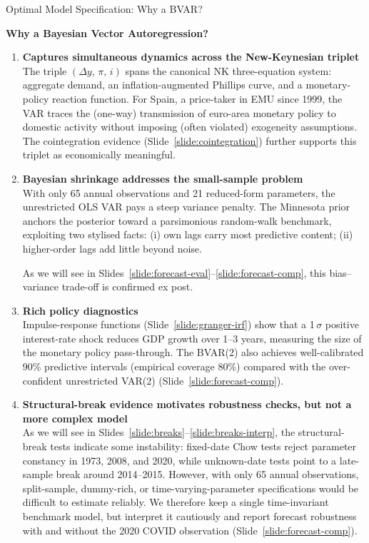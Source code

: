 \documentclass[9pt]{beamer}
\begin{document}
\begin{frame}{Optimal Model Specification: Why a BVAR?}
\label{slide:bvar}

\textbf{\footnotesize Why a Bayesian Vector Autoregression?}

\scriptsize
\begin{enumerate}
  \item \textbf{Captures simultaneous dynamics across the New-Keynesian triplet}\\
        The triple $(\Delta y,\,\pi,\,i)$ spans the canonical NK three-equation system: aggregate demand, an inflation-augmented Phillips curve, and a monetary-policy reaction function. For Spain, a price-taker in EMU since 1999, the VAR traces the (one-way) transmission of euro-area monetary policy to domestic activity without imposing (often violated) exogeneity assumptions. The cointegration evidence (Slide~\ref{slide:cointegration}) further supports this triplet as economically meaningful.

  \item \textbf{Bayesian shrinkage addresses the small-sample problem}\\
        With only 65 annual observations and 21 reduced-form parameters, the unrestricted OLS VAR pays a steep variance penalty. The Minnesota prior anchors the posterior toward a parsimonious random-walk benchmark, exploiting two stylised facts: (i) own lags carry most predictive content; (ii) higher-order lags add little beyond noise.
        
        As we will see in Slides~\ref{slide:forecast-eval}--\ref{slide:forecast-comp}, this bias--variance trade-off is confirmed ex post.

  \item \textbf{Rich policy diagnostics}\\
        Impulse-response functions (Slide~\ref{slide:granger-irf}) show that a 1\,$\sigma$ positive interest-rate shock reduces GDP growth over 1--3 years, measuring the size of the monetary policy pass-through. The BVAR(2) also achieves well-calibrated 90\% predictive intervals (empirical coverage 80\%) compared with the over-confident unrestricted VAR(2) (Slide~\ref{slide:forecast-comp}).

  \item \textbf{Structural-break evidence motivates robustness checks, but not a more complex model}\\
        As we will see in Slides~\ref{slide:breaks}--\ref{slide:breaks-interp}, the structural-break tests indicate some instability: fixed-date Chow tests reject parameter constancy in 1973, 2008, and 2020, while unknown-date tests point to a late-sample break around 2014–2015. However, with only 65 annual observations, split-sample, dummy-rich, or time-varying-parameter specifications would be difficult to estimate reliably. We therefore keep a single time-invariant benchmark model, but interpret it cautiously and report forecast robustness with and without the 2020 COVID observation (Slide~\ref{slide:forecast-comp}).
\end{enumerate}


\end{frame}
\end{document}
